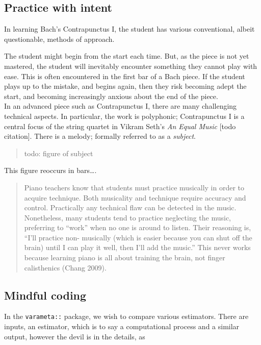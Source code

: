 \documentclass[
]{article}
\begin{document}
\hypertarget{practice-with-intent}{%
\subsection{Practice with intent}\label{practice-with-intent}}

In learning Bach's Contrapunctus I, the student has various
conventional, albeit questionable, methods of approach.

The student might begin from the start each time. But, as the piece is
not yet mastered, the student will inevitably encounter something they
cannot play with ease. This is often encountered in the first bar of a
Bach piece. If the student plays up to the mistake, and begins again,
then they risk becoming adept the start, and becoming increasingly
anxious about the end of the piece.\\
In an advanced piece such as Contrapunctus I, there are many challenging
technical aspects. In particular, the work is polyphonic; Contrapunctus
I is a central focus of the string quartet in Vikram Seth's \emph{An
Equal Music} {[}todo citation{]}. There is a melody; formally referred
to as a \emph{subject}.

\begin{quote}
todo: figure of subject
\end{quote}

This figure reoccurs in bars\ldots.

\begin{quote}
Piano teachers know that students must practice musically in order to
acquire technique. Both musicality and technique require accuracy and
control. Practically any technical flaw can be detected in the music.
Nonetheless, many students tend to practice neglecting the music,
preferring to ``work'' when no one is around to listen. Their reasoning
is, ``I'll practice non- musically (which is easier because you can shut
off the brain) until I can play it well, then I'll add the music.'' This
never works because learning piano is all about training the brain, not
finger calisthenics (Chang 2009).
\end{quote}

\hypertarget{mindful-coding}{%
\subsection{Mindful coding}\label{mindful-coding}}

In the \texttt{varameta::} package, we wish to compare various
estimators. There are inputs, an estimator, which is to say a
computational process and a similar output, however the devil is in the
details, as
\end{document}
